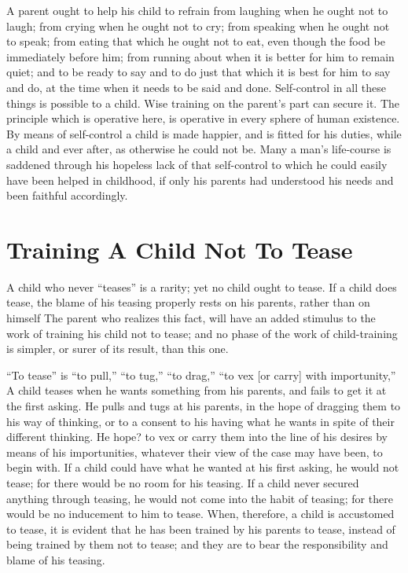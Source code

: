 \documentclass[
]{book}
\begin{document}
A parent ought to help his child to refrain from laughing when he ought not to laugh; from crying when he ought not to cry; from speaking when he ought not to speak; from eating that which he ought not to eat, even though the food be immediately before him; from running about when it is better for him to remain quiet; and to be ready to say and to do just that which it is best for him to say and do, at the time when it needs to be said and done. Self-control in all these things is possible to a child. Wise training on the parent's part can secure it. The principle which is operative here, is operative in every sphere of human existence. By means of self-control a child is made happier, and is fitted for his duties, while a child and ever after, as otherwise he could not be. Many a man's life-course is saddened through his hopeless lack of that self-control to which he could easily have been helped in childhood, if only his parents had understood his needs and been faithful accordingly.

\hypertarget{training-a-child-not-to-tease}{%
\chapter{Training A Child Not To Tease}\label{training-a-child-not-to-tease}}

A child who never ``teases'' is a rarity; yet no child ought to tease. If a child does tease, the blame of his teasing properly rests on his parents, rather than on himself The parent who realizes this fact, will have an added stimulus to the work of training his child not to tease; and no phase of the work of child-training is simpler, or surer of its result, than this one.

``To tease'' is ``to pull,'' ``to tug,'' ``to drag,'' ``to vex {[}or carry{]} with importunity,'' A child teases when he wants something from his parents, and fails to get it at the first asking. He pulls and tugs at his parents, in the hope of dragging them to his way of thinking, or to a consent to his having what he wants in spite of their different thinking. He hope? to vex or carry them into the line of his desires by means of his importunities, whatever their view of the case may have been, to begin with. If a child could have what he wanted at his first asking, he would not tease; for there would be no room for his teasing. If a child never secured anything through teasing, he would not come into the habit of teasing; for there would be no inducement to him to tease. When, therefore, a child is accustomed to tease, it is evident that he has been trained by his parents to tease, instead of being trained by them not to tease; and they are to bear the responsibility and blame of his teasing.
\end{document}
